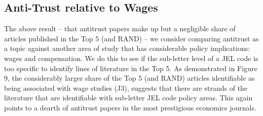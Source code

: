\documentclass[11pt, letterpaper, twoside]{article}
\begin{document}
\subsection{Anti-Trust relative to Wages}
The above result -- that antitrust papers make up but a negligible share of articles published in the Top 5 (and RAND) -- we consider comparing antitrust as a topic against another area of study that has considerable policy implications: wages and compensation. We do this to see if the sub-letter level of a JEL code is too specific to identify lines of literature in the Top 5. As demonstrated in Figure 9, the considerably larger share of the Top 5 (and RAND) articles identifiable as being associated with wage studies (J3), suggests that there are strands of the literature that are identifiable with sub-letter JEL code policy areas. This again points to a dearth of antitrust papers in the most prestigious economics journals. 
\end{document}
